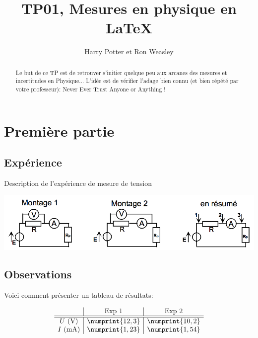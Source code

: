 \documentclass[12pt,a4paper]{article}
\title{TP01, Mesures en physique en \LaTeX}
\author{Harry Potter et Ron Weasley}
\date{}
\newcommand{\U}[1]{~\mathrm{#1}}
\newenvironment{problematique}{
\renewcommand{\abstractname}{Problématique}
\begin{abstract}
}{
\end{abstract}
}
\begin{document}
\maketitle

\begin{problematique}
Le but de ce TP est de retrouver s'initier quelque peu aux arcanes des mesures et incertitudes en Physique... L'idée est de vérifier l'adage bien connu (et bien répété par votre professeur): \og{}Never Ever Trust Anyone or Anything !\fg{}

\end{problematique}

\section{Première partie}

\subsection{Expérience}

Description de l'expérience de mesure de tension

\begin{center}
\includegraphics[width=\linewidth]{TP01_schema}
\end{center}

\subsection{Observations}

Voici comment présenter un tableau de résultats:

$$
\begin{array}{c|c|c} %
	&	\text{Exp 1}	&	\text{Exp 2}	%
    \\ \hline\hline %
U\U{(V)}	&	\numprint{12,3}	&	\numprint{10,2}	\\
I\U{(mA)}	&	\numprint{1,23}	&	\numprint{1,54}	\\
\end{array}
$$
\end{document}
